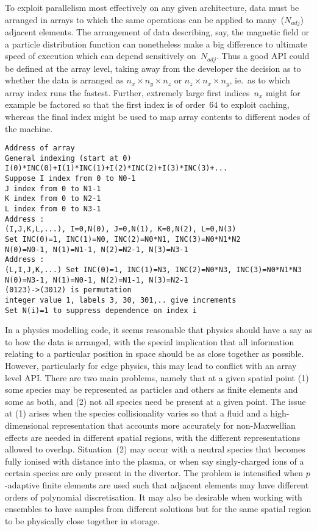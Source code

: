 To exploit parallelism most effectively on any given architecture,
data must be arranged in arrays to which the same operations
can be applied to many~($N_{adj}$)  adjacent elements. The arrangement of data describing, say, the
magnetic field or a particle distribution function can nonetheless make a big difference
to ultimate speed of execution which can depend sensitively on~$N_{adj}$.
Thus a good API could be defined  at the array level, taking away from the developer
the decision as to whether the data is arranged as $n_x \times n_y \times n_z$
or $n_z \times n_x \times n_y$, ie.\ as to which array index runs the fastest. 
Further, extremely large first indices~$n_x$
might for example be factored so that the first index is of order~$64$ to exploit caching,
whereas the final index might be used to map array contents to different nodes of the machine.

\begin{verbatim}
Address of array
General indexing (start at 0)
I(0)*INC(0)+I(1)*INC(1)+I(2)*INC(2)+I(3)*INC(3)+...
Suppose I index from 0 to N0-1
J index from 0 to N1-1
K index from 0 to N2-1
L index from 0 to N3-1
Address :
(I,J,K,L,...), I=0,N(0), J=0,N(1), K=0,N(2), L=0,N(3)
Set INC(0)=1, INC(1)=N0, INC(2)=N0*N1, INC(3)=N0*N1*N2
N(0)=N0-1, N(1)=N1-1, N(2)=N2-1, N(3)=N3-1
Address :
(L,I,J,K,...) Set INC(0)=1, INC(1)=N3, INC(2)=N0*N3, INC(3)=N0*N1*N3
N(0)=N3-1, N(1)=N0-1, N(2)=N1-1, N(3)=N2-1
(0123)->(3012) is permutation
integer value 1, labels 3, 30, 301,.. give increments
Set N(i)=1 to suppress dependence on index i
\end{verbatim}

In a physics modelling code, it seems reasonable that physics should have a say as to how 
the data is arranged, with the special implication that all information relating to a particular position in
space should be as close together as possible. However, particularly for edge physics, this
may lead to conflict with an array level API. There are two main problems, namely that
at a given spatial point (1) some species may be represented as particles and others
as finite elements and some as both, and (2) not all species need be present at a given point.
The issue at (1) arises when the species collisionality varies so that a fluid and a 
high-dimensional representation that accounts more accurately for non-Maxwellian effects are needed in
different spatial regions, with the different representations allowed to overlap. Situation~(2)
may occur with a neutral species that becomes fully ionised with distance into the plasma,
or when say singly-charged ions of a certain species are only present in the divertor.
The problem is intensified when $p$-adaptive finite elements are used such that adjacent
elements may have different orders of polynomial discretisation. It may also be desirable
when working with ensembles to have samples from different solutions but for the same spatial region
to be physically close together in storage.


